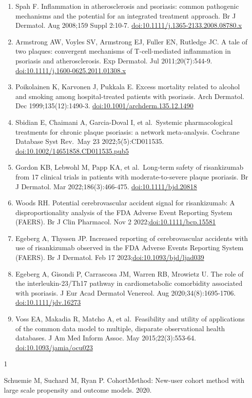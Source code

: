 \documentclass[
  12pt,
]{article}
\newlength{\cslhangindent}
\newlength{\csllabelwidth}
\newlength{\cslentryspacingunit} %
\newenvironment{CSLReferences}[2] %
 {%
  \setlength{\parindent}{0pt}
  \ifodd #1
  \let\oldpar\par
  \def\par{\hangindent=\cslhangindent\oldpar}
  \fi
  \setlength{\parskip}{#2\cslentryspacingunit}
 }%
 {}
\newcommand{\CSLLeftMargin}[1]{\parbox[t]{\csllabelwidth}{#1}}
\newcommand{\CSLRightInline}[1]{\parbox[t]{\linewidth - \csllabelwidth}{#1}\break}
\begin{document}
\begin{enumerate}
\item
  Spah F. Inflammation in atherosclerosis and psoriasis: common pathogenic mechanisms and the potential for an integrated treatment approach. Br J Dermatol. Aug 2008;159 Suppl 2:10-7. \url{doi:10.1111/j.1365-2133.2008.08780.x}
\item
  Armstrong AW, Voyles SV, Armstrong EJ, Fuller EN, Rutledge JC. A tale of two plaques: convergent mechanisms of T-cell-mediated inflammation in psoriasis and atherosclerosis. Exp Dermatol. Jul 2011;20(7):544-9. \url{doi:10.1111/j.1600-0625.2011.01308.x}
\item
  Poikolainen K, Karvonen J, Pukkala E. Excess mortality related to alcohol and smoking among hospital-treated patients with psoriasis. Arch Dermatol. Dec 1999;135(12):1490-3. \url{doi:10.1001/archderm.135.12.1490}
\item
  Sbidian E, Chaimani A, Garcia-Doval I, et al.~Systemic pharmacological treatments for chronic plaque psoriasis: a network meta-analysis. Cochrane Database Syst Rev.~May 23 2022;5(5):CD011535. \url{doi:10.1002/14651858.CD011535.pub5}
\item
  Gordon KB, Lebwohl M, Papp KA, et al.~Long-term safety of risankizumab from 17 clinical trials in patients with moderate-to-severe plaque psoriasis. Br J Dermatol. Mar 2022;186(3):466-475. \url{doi:10.1111/bjd.20818}
\item
  Woods RH. Potential cerebrovascular accident signal for risankizumab: A disproportionality analysis of the FDA Adverse Event Reporting System (FAERS). Br J Clin Pharmacol. Nov 2 2022;\url{doi:10.1111/bcp.15581}
\item
  Egeberg A, Thyssen JP. Increased reporting of cerebrovascular accidents with use of risankizumab observed in the FDA Adverse Events Reporting System (FAERS). Br J Dermatol. Feb 17 2023;\url{doi:10.1093/bjd/ljad039}
\item
  Egeberg A, Gisondi P, Carrascosa JM, Warren RB, Mrowietz U. The role of the interleukin-23/Th17 pathway in cardiometabolic comorbidity associated with psoriasis. J Eur Acad Dermatol Venereol. Aug 2020;34(8):1695-1706. \url{doi:10.1111/jdv.16273}
\item
  Voss EA, Makadia R, Matcho A, et al.~Feasibility and utility of applications of the common data model to multiple, disparate observational health databases. J Am Med Inform Assoc. May 2015;22(3):553-64. \url{doi:10.1093/jamia/ocu023}
\end{enumerate}

\hypertarget{refs}{}
\begin{CSLReferences}{0}{0}
\leavevmode{}%
\CSLLeftMargin{1 }%
\CSLRightInline{Schuemie M, Suchard M, Ryan P. {CohortMethod}: New-user cohort method with large scale propensity and outcome models. 2020.}

\end{CSLReferences}
\end{document}
